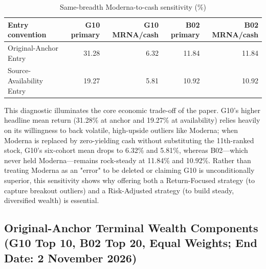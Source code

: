 \documentclass[11pt,a4paper]{article}
\numberwithin{table}{section}
\begin{document}
\begin{minipage}{\linewidth}
\begin{center}\small\setlength{\tabcolsep}{3pt}\renewcommand{\arraystretch}{1.18}
\begin{longtable}{@{}p{.22\linewidth}rrrr@{}}
\caption{Same-breadth Moderna-to-cash sensitivity (\%)}\\
\toprule
Entry convention & G10 primary & G10 MRNA/cash & B02 primary & B02 MRNA/cash\\\midrule\endhead
Original-Anchor Entry & 31.28 & 6.32 & 11.84 & 11.84\\
Source-Availability Entry & 19.27 & 5.81 & 10.92 & 10.92\\
\bottomrule\end{longtable}\end{center}
\end{minipage}\par
This diagnostic illuminates the core economic trade-off of the paper. G10's higher headline mean return (31.28\% at anchor and 19.27\% at availability) relies heavily on its willingness to back volatile, high-upside outliers like Moderna; when Moderna is replaced by zero-yielding cash without substituting the 11th-ranked stock, G10's six-cohort mean drops to 6.32\% and 5.81\%, whereas B02---which never held Moderna---remains rock-steady at 11.84\% and 10.92\%. Rather than treating Moderna as an "error" to be deleted or claiming G10 is unconditionally superior, this sensitivity shows why offering both a Return-Focused strategy (to capture breakout outliers) and a Risk-Adjusted strategy (to build steady, diversified wealth) is essential.

\subsection{Original-Anchor Terminal Wealth Components (G10 Top 10, B02 Top 20, Equal Weights; End Date: 2 November 2026)}
\end{document}
